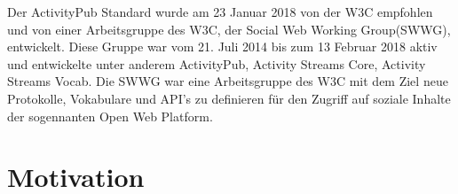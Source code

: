 {		
	Der ActivityPub\cite{activityPub} Standard wurde am 23 Januar 2018 von der W3C empfohlen und von einer Arbeitsgruppe des W3C, der Social Web Working Group(SWWG)\cite{socialWg,pushSocialWeb}, entwickelt. Diese Gruppe war vom 21. Juli 2014 bis zum 13 Februar 2018 aktiv\cite{socialWg} und entwickelte unter anderem ActivityPub, Activity Streams Core\cite{activityStreamsCore}, Activity Streams Vocab\cite{activityStreamsVocabulary}. Die SWWG war eine Arbeitsgruppe des W3C mit dem Ziel neue Protokolle, Vokabulare und API's zu definieren für den Zugriff auf soziale Inhalte der sogennanten Open Web Platform\cite{social-wg-charter}.\\
}

\section{Motivation}
\label{sec:Introduction:Motivation}
